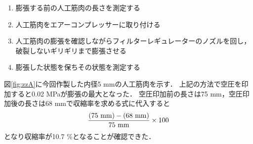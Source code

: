 \begin{enumerate}
    \item 膨張する前の人工筋肉の長さを測定する
    \item 人工筋肉をエアーコンプレッサーに取り付ける
    \item 人工筋肉の膨張を確認しながらフィルターレギュレーターのノズルを回し，破裂しないギリギリまで膨張させる
    \item 膨張した状態を保ちその状態を測定する
\end{enumerate}
図\ref{fig:zzA}に今回作製した内径5 mmの人工筋肉を示す．
上記の方法で空圧を印加すると0.02 MPaが膨張の最大となった．
空圧印加前の長さは75 mm，空圧印加後の長さは68 mmで収縮率を求める式に代入すると
$$\frac{(75~\rm{mm})-(68~\rm{mm})}{75~\rm{mm}}\times 100\\$$
となり収縮率が10.7 \%となることが確認できた．
